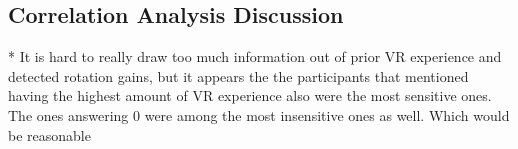 \subsection{Correlation Analysis Discussion}
* It is hard to really draw too much information out of prior VR experience and detected rotation gains, but it appears the the participants that mentioned having the highest amount of VR experience also were the most sensitive ones. The ones answering 0 were among the most insensitive ones as well. Which would be reasonable